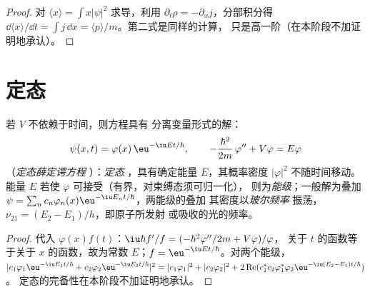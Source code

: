 \begin{proof}
对 $\langle x\rangle = \int x|\psi|^2$ 求导，利用 $\partial_t\rho =
-\partial_xj$，分部积分得 $\dd\langle x\rangle/\dd t = \int j\,\dd x
= \langle p\rangle/m$。第二式是同样的计算，
只是高一阶（在本阶段不加证明地承认）。
\end{proof}

\section{定态}

\begin{theorem}[定态]\label{thm:b2:schrodinger-wave-functions:stationary}
若 $V$ 不依赖于时间，则方程具有
分离变量形式的解：
\[
\psi(x,t) = \varphi(x)\,\eu^{-\iu Et/\hbar}, \qquad
-\frac{\hbar^2}{2m}\,\varphi'' + V\varphi = E\varphi
\]
（\emph{定态薛定谔方程}
）：\emph{定态}
，具有确定能量 $E$，其概率密度
$|\varphi|^2$ 不随时间移动。能量 $E$ 若使 $\varphi$
可接受（有界，对束缚态须可归一化），
则为\emph{能级}；一般解为叠加 $\psi =
\sum_nc_n\varphi_n(x)\eu^{-\iu E_nt/\hbar}$，两能级的叠加
其密度以\emph{玻尔频率}
振荡，$\nu_{21} = (E_2 - E_1)/h$，即原子所发射
或吸收的光的频率。
\end{theorem}

\begin{proof}
代入 $\varphi(x)f(t)$：$\iu\hbar f'/f = (-\hbar^2\varphi''/2m + V\varphi)/\varphi$，
关于 $t$ 的函数等于关于 $x$ 的函数，故为常数 $E$；$f
= \eu^{-\iu Et/\hbar}$。对两个能级，$|c_1\varphi_1\eu^{-\iu E_1t/\hbar} +
c_2\varphi_2\eu^{-\iu E_2t/\hbar}|^2 = |c_1\varphi_1|^2 + |c_2\varphi_2|^2 +
2\operatorname{Re}(c_1^*c_2\varphi_1^*\varphi_2\eu^{-\iu(E_2 - E_1)t/\hbar})$。
定态的完备性在本阶段不加证明地承认。
\end{proof}

